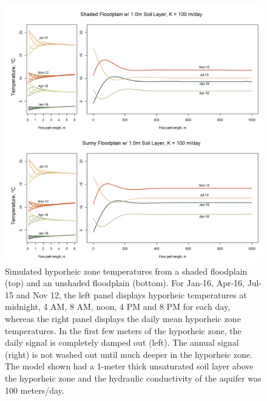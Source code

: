\documentclass[letterpaper, 11pt]{article}
\begin{document}
\begin{figure}
    \centering
    \includegraphics{Figures/shaded_and_sunny_1.0_daily_with_annual_k100.png}
    \caption{Simulated hyporheic zone temperatures from a shaded floodplain (top) and an unshaded floodplain (bottom). For Jan-16, Apr-16, Jul-15 and Nov 12, the left panel displays hyporheic temperatures at midnight, 4 AM, 8 AM, noon, 4 PM and 8 PM for each day, whereas the right panel displays the daily mean hyporheic zone temperatures. In the first few meters of the hyporheic zone, the daily signal is completely damped out (left). The annual signal (right) is not washed out until much deeper in the hyporheic zone. The model shown had a 1-meter thick unsaturated soil layer above the hyporheic zone and the hydraulic conductivity of the aquifer was 100 meters/day.}
    \label{fig:dailyAnnualK100}
\end{figure}
\end{document}
